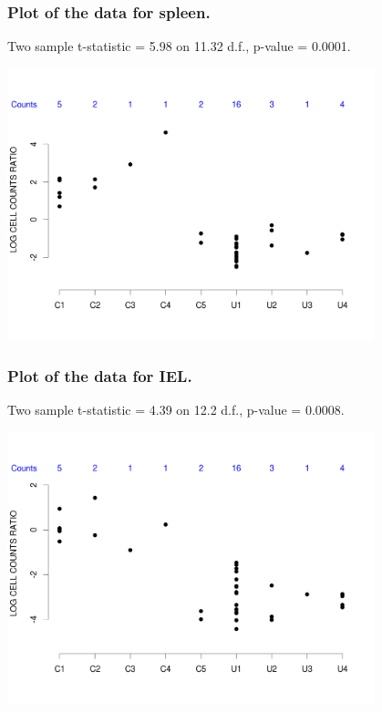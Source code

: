 \documentclass{beamer}
\begin{document}
\begin{frame}
\frametitle{Plot of the data for spleen.}
Two sample t-statistic = 5.98 on \alert{11.32} d.f., p-value = 0.0001.
\begin{center}
\includegraphics[width=0.8\textwidth]{plot_spleen}
\end{center}
\end{frame}

\begin{frame}
\frametitle{Plot of the data for IEL.}
Two sample t-statistic = 4.39 on  \alert{12.2} d.f., p-value = 0.0008.
\begin{center}
\includegraphics[width=0.8\textwidth]{plot_iel}
\end{center}
\end{frame}
\end{document}
